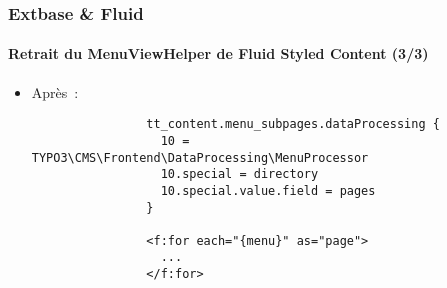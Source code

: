 
\begin{frame}[fragile]
	\frametitle{Extbase \& Fluid}
	\framesubtitle{Retrait du MenuViewHelper de Fluid Styled Content (3/3)}

	\lstset{basicstyle=\tiny\ttfamily}

	\begin{itemize}

		\item Après~:

			\begin{lstlisting}
				tt_content.menu_subpages.dataProcessing {
				  10 = TYPO3\CMS\Frontend\DataProcessing\MenuProcessor
				  10.special = directory
				  10.special.value.field = pages
				}

				<f:for each="{menu}" as="page">
				  ...
				</f:for>
			\end{lstlisting}

	\end{itemize}

\end{frame}


